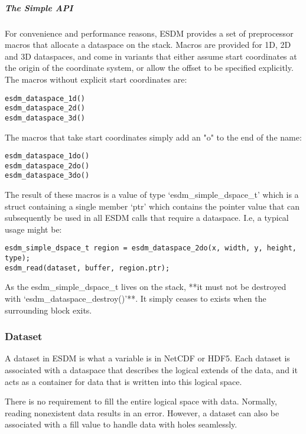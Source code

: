 \subparagraph{The Simple API}

For convenience and performance reasons, ESDM provides a set of
preprocessor macros that allocate a dataspace on the stack. Macros are
provided for 1D, 2D and 3D dataspaces, and come in variants that either
assume start coordinates at the origin of the coordinate system, or
allow the offset to be specified explicitly. The macros without explicit
start coordinates are:

\begin{lstlisting}
esdm_dataspace_1d()
esdm_dataspace_2d()
esdm_dataspace_3d()
\end{lstlisting}

The macros that take start coordinates simply add an "o" to the end of
the name:

\begin{lstlisting}
esdm_dataspace_1do()
esdm_dataspace_2do()
esdm_dataspace_3do()
\end{lstlisting}

The result of these macros is a value of type `esdm\_simple\_dspace\_t'
which is a struct containing a single member `ptr' which contains the
pointer value that can subsequently be used in all ESDM calls that
require a dataspace. I.e, a typical usage might be:

\begin{lstlisting}
esdm_simple_dspace_t region = esdm_dataspace_2do(x, width, y, height, type);
esdm_read(dataset, buffer, region.ptr);
\end{lstlisting}

As the esdm\_simple\_dspace\_t lives on the stack, **it must not be
destroyed with `esdm\_dataspace\_destroy()'**. It simply ceases to
exists when the surrounding block exits.

\subsubsection{Dataset}
\label{sec:user-guides:dataset}

A dataset in ESDM is what a variable is in NetCDF or HDF5. Each dataset
is associated with a dataspace that describes the logical extends of the
data, and it acts as a container for data that is written into this
logical space.

There is no requirement to fill the entire logical space with data.
Normally, reading nonexistent data results in an error. However, a
dataset can also be associated with a fill value to handle data with
holes seamlessly.

